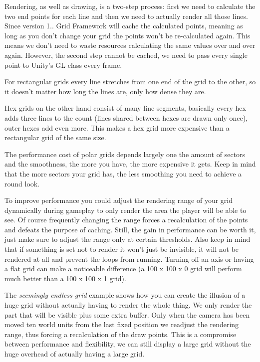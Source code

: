Rendering, as well as drawing, is a two-\/step process\+: first we need to calculate the two end points for each line and then we need to actually render all those lines. Since version 1.. Grid Framework will cache the calculated points, meaning as long as you don’t change your grid the points won’t be re-\/calculated again. This means we don’t need to waste resources calculating the same values over and over again. However, the second step cannot be cached, we need to pass every single point to Unity’s G\+L class every frame.

For rectangular grids every line stretches from one end of the grid to the other, so it doesn’t matter how long the lines are, only how dense they are.

Hex grids on the other hand consist of many line segments, basically every hex adds three lines to the count (lines shared between hexes are drawn only once), outer hexes add even more. This makes a hex grid more expensive than a rectangular grid of the same size.

The performance cost of polar grids depends largely one the amount of {\ttfamily sectors} and the {\ttfamily smoothness}, the more you have, the more expensive it gets. Keep in mind that the more sectors your grid has, the less smoothing you need to achieve a round look.

To improve performance you could adjust the rendering range of your grid dynamically during gameplay to only render the area the player will be able to see. Of course frequently changing the range forces a recalculation of the points and defeats the purpose of caching. Still, the gain in performance can be worth it, just make sure to adjust the range only at certain thresholds. Also keep in mind that if something is set not to render it won’t just be invisible, it will not be rendered at all and prevent the loops from running. Turning off an axis or having a flat grid can make a noticeable difference (a 100 x 100 x 0 grid will perform much better than a 100 x 100 x 1 grid).

The {\itshape seemingly endless grid} example shows how you can create the illusion of a huge grid without actually having to render the whole thing. We only render the part that will be visible plus some extra buffer. Only when the camera has been moved ten world units from the last fixed position we readjust the rendering range, thus forcing a recalculation of the draw points. This is a compromise between performance and flexibility, we can still display a large grid without the huge overhead of actually having a large grid. 